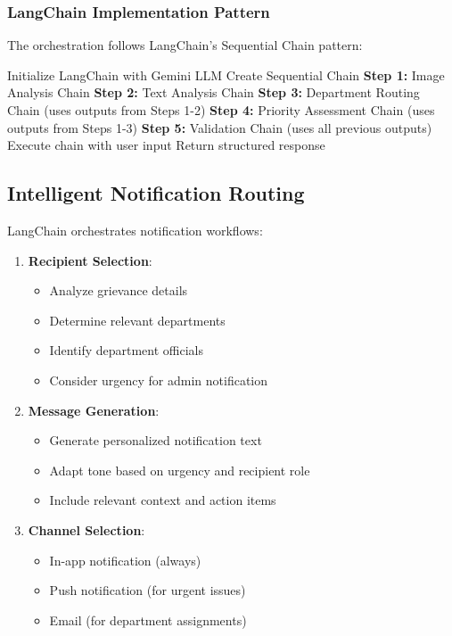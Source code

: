 \documentclass[12pt,a4paper]{article}
\begin{document}
\subsubsection{LangChain Implementation Pattern}

The orchestration follows LangChain's Sequential Chain pattern:

\begin{algorithm}[H]
\caption{AI Orchestration Workflow}
\begin{algorithmic}[1]
\State Initialize LangChain with Gemini LLM
\State Create Sequential Chain
\State \textbf{Step 1:} Image Analysis Chain
\State \textbf{Step 2:} Text Analysis Chain
\State \textbf{Step 3:} Department Routing Chain (uses outputs from Steps 1-2)
\State \textbf{Step 4:} Priority Assessment Chain (uses outputs from Steps 1-3)
\State \textbf{Step 5:} Validation Chain (uses all previous outputs)
\State Execute chain with user input
\State Return structured response
\end{algorithmic}
\end{algorithm}

\subsection{Intelligent Notification Routing}

LangChain orchestrates notification workflows:

\begin{enumerate}
    \item \textbf{Recipient Selection}: 
    \begin{itemize}
        \item Analyze grievance details
        \item Determine relevant departments
        \item Identify department officials
        \item Consider urgency for admin notification
    \end{itemize}
    
    \item \textbf{Message Generation}:
    \begin{itemize}
        \item Generate personalized notification text
        \item Adapt tone based on urgency and recipient role
        \item Include relevant context and action items
    \end{itemize}
    
    \item \textbf{Channel Selection}:
    \begin{itemize}
        \item In-app notification (always)
        \item Push notification (for urgent issues)
        \item Email (for department assignments)
    \end{itemize}
\end{enumerate}
\end{document}
